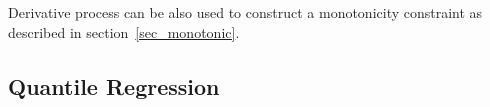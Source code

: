 \documentclass[twoside,11pt]{article}
\newcommand{\code}[1]{{\normalfont\texttt{#1}}}
\begin{document}





Derivative process can be also used to construct a monotonicity constraint as described in section~\ref{sec_monotonic}.

\subsection{Quantile Regression}
\end{document}
